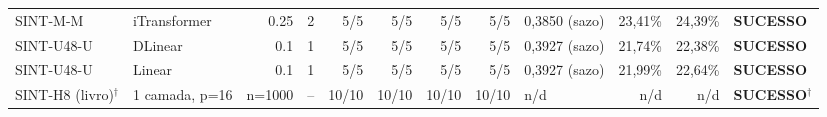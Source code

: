 \begin{longtable}{llrrrrrrlrrl}
SINT-M-M & iTransformer & 0.25 & 2 & 5/5 & 5/5 & 5/5 & 5/5 & 0,3850 (sazo) & \textminus{}23,41\% & \textminus{}24,39\% & \textbf{SUCESSO} \\
SINT-U48-U & DLinear & 0.1 & 1 & 5/5 & 5/5 & 5/5 & 5/5 & 0,3927 (sazo) & \textminus{}21,74\% & \textminus{}22,38\% & \textbf{SUCESSO} \\
SINT-U48-U & Linear & 0.1 & 1 & 5/5 & 5/5 & 5/5 & 5/5 & 0,3927 (sazo) & \textminus{}21,99\% & \textminus{}22,64\% & \textbf{SUCESSO} \\
SINT-H8 (livro)$^\dagger$ & 1 camada, p=16 & n=1000 & -- & 10/10 & 10/10 & 10/10 & 10/10 & n/d & n/d & n/d & \textbf{SUCESSO}$^\dagger$ \\
\end{longtable}
\normalsize
